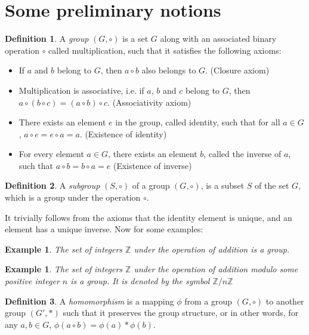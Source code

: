 \documentclass[12pt, titlepage]{article}
\newtheorem{exmp}[thm]{Example}
\theoremstyle{definition}
\newtheorem{defn}{Definition}[section]
\begin{document}
\section{Some preliminary notions}

\begin{defn}
A \emph{group} $(G, \circ)$ is a set $G$ along with an associated binary operation $\circ$ called multiplication, such that it satisfies the following axioms:
\begin{itemize}
\item If $a$ and $b$ belong to $G$, then $a \circ b$ also belongs to $G$. (Closure axiom)
\item Multiplication is associative, i.e. if $a$, $b$ and $c$ belong to $G$, then $a \circ (b \circ c) = (a \circ b) \circ c$. (Associativity axiom)
\item There exists an element $e$ in the group, called identity, such that for all $a \in G$, $a \circ e = e \circ a = a$. (Existence of identity)
\item For every element $a \in G$, there exists an element $b$, called the inverse of $a$, such that $a \circ b = b \circ a = e$ (Existence of inverse)
\end{itemize}
\end{defn}

\begin{defn}
A \emph{subgroup} $(S, \circ)$ of a group $(G, \circ)$, is a subset $S$ of the set $G$, which is a group under the operation $\circ$.
\end{defn}

It trivially follows from the axioms that the identity element is unique, and an element has a unique inverse. Now for some examples:

\begin{exmp}
\label{int}
The set of integers $\mathbb{Z}$ under the operation of addition is a group.
\end{exmp}

\begin{exmp}
\label{int_mod}
The set of integers $\mathbb{Z}$ under the operation of addition modulo some positive integer $n$ is a group. It is denoted by the symbol $\mathbb{Z}/n\mathbb{Z}$
\end{exmp}

\begin{defn}
A \emph{homomorphism} is a mapping $\phi$ from a group $(G, \circ)$ to another group $(G', *)$ such that it preserves the group structure, or in other words, for any $a,b \in G$, $\phi(a \circ b) = \phi(a) * \phi(b)$.
\end{defn}
\end{document}
